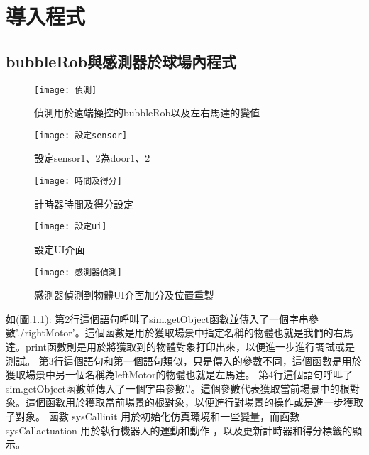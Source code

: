 \chapter{導入程式}
\section{bubbleRob與感測器於球場內程式}
\begin{figure}[hbt!]
\begin{center}
\texttt{[image: 偵測]}
\caption{\Large 偵測用於遠端操控的bubbleRob以及左右馬達的變值}\label{偵測用於遠端操控的bubbleRob以及左右馬達的變值}
\end{center}
\end{figure} 
\begin{figure}[hbt!]
\begin{center}
\texttt{[image: 設定sensor]}
\caption{\Large 設定sensor1、2為door1、2}\label{設定sensor1、2為door1、2}
\end{center}
\end{figure} 
\begin{figure}[hbt!]
\begin{center}
\texttt{[image: 時間及得分]}
\caption{\Large 計時器時間及得分設定}\label{計時器時間及得分設定}
\end{center}
\end{figure} 
\begin{figure}[hbt!]
\begin{center}
\texttt{[image: 設定ui]}
\caption{\Large 設定UI介面}\label{設定UI介面}
\end{center}
\end{figure} 
\newpage
\begin{figure}[hbt!]
\begin{center}
\texttt{[image: 感測器偵測]}
\caption{\Large 感測器偵測到物體UI介面加分及位置重製}\label{感測器偵測到物體UI介面加分及位置重製}
\end{center}
\end{figure} 
如(圖.\ref{偵測用於遠端操控的bubbleRob以及左右馬達的變值}):
第2行這個語句呼叫了sim.getObject函數並傳入了一個字串參數'./rightMotor'。這個函數是用於獲取場景中指定名稱的物體也就是我們的右馬達。print函數則是用於將獲取到的物體對象打印出來，以便進一步進行調試或是測試。
第3行這個語句和第一個語句類似，只是傳入的參數不同，這個函數是用於獲取場景中另一個名稱為leftMotor的物體也就是左馬達。
第4行這個語句呼叫了sim.getObject函數並傳入了一個字串參數'.'。這個參數代表獲取當前場景中的根對象。這個函數用於獲取當前場景的根對象，以便進行對場景的操作或是進一步獲取子對象。
函數 sysCallinit 用於初始化仿真環境和一些變量，而函數 sysCallactuation 用於執行機器人的運動和動作
，以及更新計時器和得分標籤的顯示。\\

